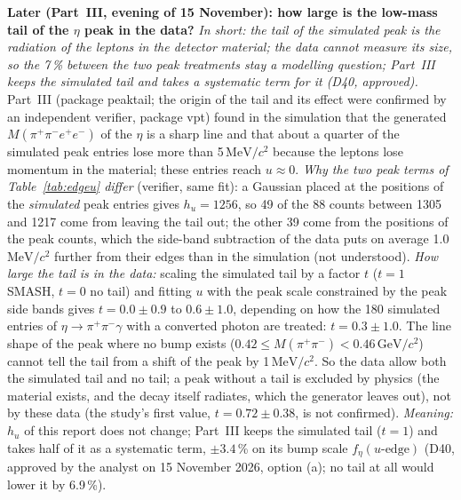 \documentclass[11pt,a4paper]{article}
\newcommand{\pipi}{\ensuremath{\pi^{+}\pi^{-}}\xspace}
\newcommand{\Mfour}{\ensuremath{M(\pi^{+}\pi^{-}e^{+}e^{-})}\xspace}
\newcommand{\Mpipi}{\ensuremath{M(\pi^{+}\pi^{-})}\xspace}
\newcommand{\GeVcc}{\ensuremath{\mathrm{GeV}/c^{2}}\xspace}
\newcommand{\MeVcc}{\ensuremath{\mathrm{MeV}/c^{2}}\xspace}
\begin{document}
\textbf{Later (Part~III, evening of 15 November): how large is the low-mass tail of the $\eta$ peak in the data?} \emph{In short: the
tail of the simulated peak is the radiation of the leptons in the detector material; the data cannot measure its size, so the 7\,\% between
the two peak treatments stay a modelling question; Part~III keeps the simulated tail and takes a systematic term for it (D40, approved).}
Part~III (package peaktail; the origin of the tail and its effect were confirmed by an independent verifier, package vpt) found in the
simulation that the generated \Mfour of the $\eta$ is a sharp line and that about a quarter of the simulated peak entries lose more than
5\,\MeVcc because the leptons lose momentum in the material; these entries reach $u\approx0$. \emph{Why the two peak terms of
Table~\ref{tab:edgeu} differ} (verifier, same fit): a Gaussian placed at the positions of the \emph{simulated} peak entries gives $h_u=1256$, so
49 of the 88 counts between 1305 and 1217 come from leaving the tail out; the other 39 come from the positions of the peak counts, which
the side-band subtraction of the data puts on average 1.0\,\MeVcc further from their edges than in the simulation (not understood). \emph{How large the tail is in the data:} scaling the simulated tail by a factor $t$ ($t=1$ SMASH, $t=0$
no tail) and fitting $u$ with the peak scale constrained by the peak side bands gives $t=0.0\pm0.9$ to $0.6\pm1.0$, depending on how the 180
simulated entries of $\eta\to\pipi\gamma$ with a converted photon are treated: $t=0.3\pm1.0$. The line shape of the peak where no bump exists
($0.42\le\Mpipi<0.46$\,\GeVcc) cannot tell the tail from a shift of the peak by 1\,\MeVcc. So the data allow both the simulated tail and
no tail; a peak without a tail is excluded by physics (the material exists, and the decay itself radiates, which the generator leaves out),
not by these data (the study's first value, $t=0.72\pm0.38$, is not confirmed). \emph{Meaning:} $h_u$ of this report does not change; Part~III keeps the simulated tail ($t=1$) and takes half of it as a
systematic term, $\pm3.4$\,\% on its bump scale $f_\eta(u\text{-edge})$ (D40, approved by the analyst on 15 November 2026, option (a); no tail
at all would lower it by 6.9\,\%).
\end{document}
